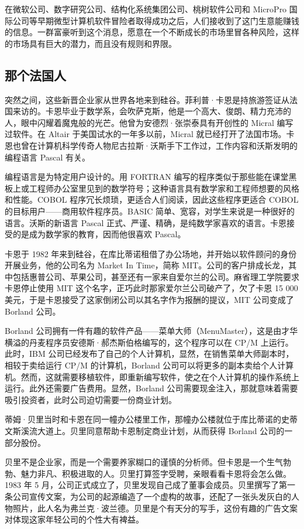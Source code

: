 \documentclass[12pt,UTF8]{ctexbook}
\begin{document}
在微软公司、数字研究公司、结构化系统集团公司、桃树软件公司和 MicroPro 国际公司等早期微型计算机软件冒险者取得成功之后，人们接收到了这门生意能赚钱的信息。一群富豪听到这个消息，愿意在一个不断成长的市场里冒各种风险，这样的市场具有巨大的潜力，而且没有规则和界限。





\subsection{那个法国人}


突然之间，这些新晋企业家从世界各地来到硅谷。菲利普·卡恩是持旅游签证从法国来访的。卡恩毕业于数学系，会吹萨克斯，他是一个高大、俊朗、精力充沛的人，眼中闪耀着魔鬼般的光芒。他曾为安德烈·张崇泰具有开创性的 Micral 编写过软件。在 Altair 于美国试水的一年多以前，Micral 就已经打开了法国市场。卡恩也曾在计算机科学传奇人物尼古拉斯·沃斯手下工作过，工作内容和沃斯发明的编程语言 Pascal 有关。

编程语言是为特定用户设计的。用 FORTRAN 编写的程序类似于那些能在课堂黑板上或工程师办公室里见到的数学符号；这种语言具有数学家和工程师想要的风格和性能。COBOL 程序冗长烦琐，更适合人们阅读，因此这些程序更适合 COBOL 的目标用户——商用软件程序员。BASIC 简单、宽容，对学生来说是一种很好的语言。沃斯的新语言 Pascal 正式、严谨、精确，是纯数学家喜欢的语言。卡恩接受的是成为数学家的教育，因而他很喜欢 Pascal。

卡恩于 1982 年来到硅谷，在库比蒂诺租借了办公场地，并开始以软件顾问的身份开展业务，他的公司名为 Market In Time，简称 MIT。公司的客户排成长龙，其中包括惠普公司、苹果公司，甚至还有一家来自爱尔兰的公司。麻省理工学院要求卡恩停止使用 MIT 这个名字，正巧此时那家爱尔兰公司破产了，欠了卡恩 15 000 美元，于是卡恩接受了这家倒闭公司以其名字作为报酬的提议，MIT 公司变成了 Borland 公司。

Borland 公司拥有一件有趣的软件产品——菜单大师（MenuMaster），这是由才华横溢的丹麦程序员安德斯·郝杰斯伯格编写的，这个程序可以在 CP/M 上运行。此时，IBM 公司已经发布了自己的个人计算机，显然，在销售菜单大师副本时，相较于卖给运行 CP/M 的计算机，Borland 公司可以将更多的副本卖给个人计算机。然而，这就需要移植软件，即重新编写软件，使之在个人计算机的操作系统上运行。此外还需要广告费用。显然，Borland 公司需要现金注入，那就意味着需要吸引投资者，此时公司迫切需要一份商业计划。

蒂姆·贝里当时和卡恩在同一幢办公楼里工作，那幢办公楼就位于库比蒂诺的史蒂文斯溪流大道上。贝里同意帮助卡恩制定商业计划，从而获得 Borland 公司的一部分股份。

贝里不是企业家，而是一个需要养家糊口的谨慎的分析师。但卡恩是一个生气勃勃、魅力非凡、积极进取的人。贝里打算签字受聘，亲眼看看卡恩将会怎么做。1983 年 5 月，公司正式成立了，贝里发现自己成了董事会成员。贝里撰写了第一条公司宣传文案，为公司的起源编造了一个虚构的故事，还配了一张头发灰白的人物照片，此人名为弗兰克·波兰德。贝里是个有天分的写手，这份有趣的广告文案对体现这家年轻公司的个性大有裨益。
\end{document}
